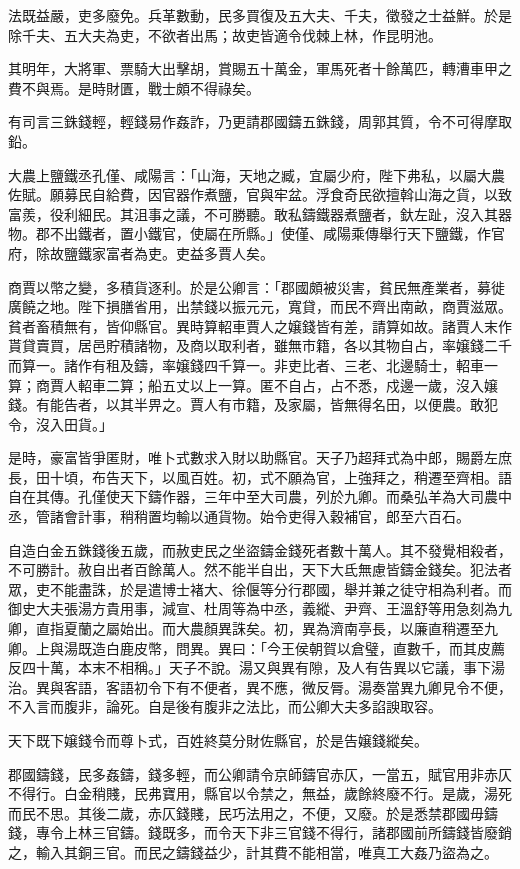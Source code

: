 \begin{pinyinscope}
法既益嚴，吏多廢免。兵革數動，民多買復及五大夫、千夫，徵發之士益鮮。於是除千夫、五大夫為吏，不欲者出馬；故吏皆適令伐棘上林，作昆明池。

其明年，大將軍、票騎大出擊胡，賞賜五十萬金，軍馬死者十餘萬匹，轉漕車甲之費不與焉。是時財匱，戰士頗不得祿矣。

有司言三銖錢輕，輕錢易作姦詐，乃更請郡國鑄五銖錢，周郭其質，令不可得摩取鉛。

大農上鹽鐵丞孔僅、咸陽言：「山海，天地之臧，宜屬少府，陛下弗私，以屬大農佐賦。願募民自給費，因官器作煮鹽，官與牢盆。浮食奇民欲擅斡山海之貨，以致富羨，役利細民。其沮事之議，不可勝聽。敢私鑄鐵器煮鹽者，釱左趾，沒入其器物。郡不出鐵者，置小鐵官，使屬在所縣。」使僅、咸陽乘傳舉行天下鹽鐵，作官府，除故鹽鐵家富者為吏。吏益多賈人矣。

商賈以幣之變，多積貨逐利。於是公卿言：「郡國頗被災害，貧民無產業者，募徙廣饒之地。陛下損膳省用，出禁錢以振元元，寬貸，而民不齊出南畝，商賈滋眾。貧者畜積無有，皆仰縣官。異時算軺車賈人之嬢錢皆有差，請算如故。諸賈人末作貰貸賣買，居邑貯積諸物，及商以取利者，雖無市籍，各以其物自占，率嬢錢二千而算一。諸作有租及鑄，率嬢錢四千算一。非吏比者、三老、北邊騎士，軺車一算；商賈人軺車二算；船五丈以上一算。匿不自占，占不悉，戍邊一歲，沒入嬢錢。有能告者，以其半畀之。賈人有市籍，及家屬，皆無得名田，以便農。敢犯令，沒入田貨。」

是時，豪富皆爭匿財，唯卜式數求入財以助縣官。天子乃超拜式為中郎，賜爵左庶長，田十頃，布告天下，以風百姓。初，式不願為官，上強拜之，稍遷至齊相。語自在其傳。孔僅使天下鑄作器，三年中至大司農，列於九卿。而桑弘羊為大司農中丞，管諸會計事，稍稍置均輸以通貨物。始令吏得入穀補官，郎至六百石。

自造白金五銖錢後五歲，而赦吏民之坐盜鑄金錢死者數十萬人。其不發覺相殺者，不可勝計。赦自出者百餘萬人。然不能半自出，天下大氐無慮皆鑄金錢矣。犯法者眾，吏不能盡誅，於是遣博士褚大、徐偃等分行郡國，舉并兼之徒守相為利者。而御史大夫張湯方貴用事，減宣、杜周等為中丞，義縱、尹齊、王溫舒等用急刻為九卿，直指夏蘭之屬始出。而大農顏異誅矣。初，異為濟南亭長，以廉直稍遷至九卿。上與湯既造白鹿皮幣，問異。異曰：「今王侯朝賀以倉璧，直數千，而其皮薦反四十萬，本末不相稱。」天子不說。湯又與異有隙，及人有告異以它議，事下湯治。異與客語，客語初令下有不便者，異不應，微反脣。湯奏當異九卿見令不便，不入言而腹非，論死。自是後有腹非之法比，而公卿大夫多諂諛取容。

天下既下嬢錢令而尊卜式，百姓終莫分財佐縣官，於是告嬢錢縱矣。

郡國鑄錢，民多姦鑄，錢多輕，而公卿請令京師鑄官赤仄，一當五，賦官用非赤仄不得行。白金稍賤，民弗寶用，縣官以令禁之，無益，歲餘終廢不行。是歲，湯死而民不思。其後二歲，赤仄錢賤，民巧法用之，不便，又廢。於是悉禁郡國毋鑄錢，專令上林三官鑄。錢既多，而令天下非三官錢不得行，諸郡國前所鑄錢皆廢銷之，輸入其銅三官。而民之鑄錢益少，計其費不能相當，唯真工大姦乃盜為之。


\end{pinyinscope}
